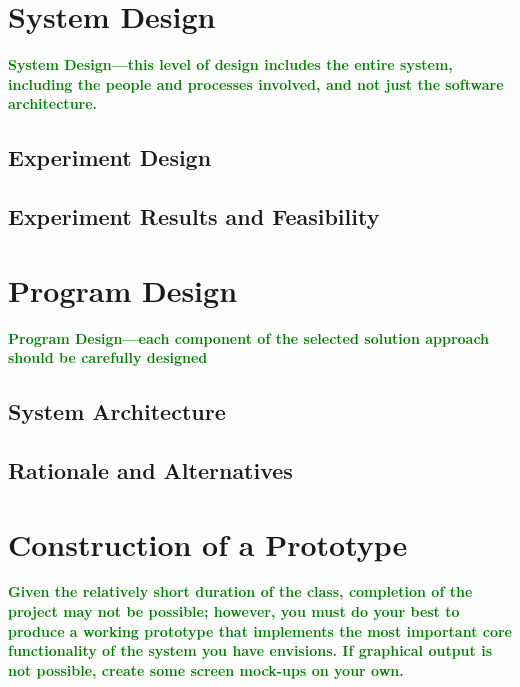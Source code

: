 \documentclass{article}
\numberwithin{equation}{section} %
\begin{document}
\section{System Design}
\textcolor{green}{\bf System Design—this level of design includes the entire system, including the people and processes involved, and not just the software architecture.}

\subsection{Experiment Design}

\subsection{Experiment Results and Feasibility}

\section{Program Design}
\textcolor{green}{\bf Program Design—each component of the selected solution approach should be carefully designed}

\subsection{System Architecture}

\subsection{Rationale and Alternatives}

\section{Construction of a Prototype}
\textcolor{green}{\bf Given the relatively short duration of the class, completion of the project may not be possible; however, you must do your best to produce a working prototype that implements the most important core functionality of the system you have envisions. If graphical output is not possible, create some screen mock-ups on your own.}
\end{document}
